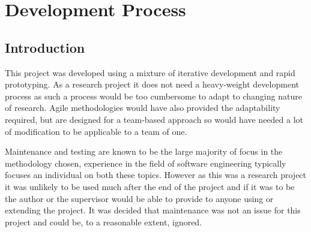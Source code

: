 \chapter{Development Process}




\section{Introduction}
This project was developed using a mixture of iterative development and rapid prototyping. As a
research project it does not need a heavy-weight development process as such a process would be
too cumbersome to adapt to changing nature of research. Agile methodologies would have also 
provided the adaptability required, but are designed for a team-based approach so would have
needed a lot of modification to be applicable to a team of one.

Maintenance and testing are known to be the large majority of focus in the methodology chosen,
experience in the field of software engineering typically focuses an individual on both these 
topics. However as this was a research project it was unlikely to be used much after the end of 
the project and if it was to be the author or the supervisor would be able to provide to anyone
using or extending the project. It was decided that maintenance was not an issue for this project
and could be, to a reasonable extent, ignored.

